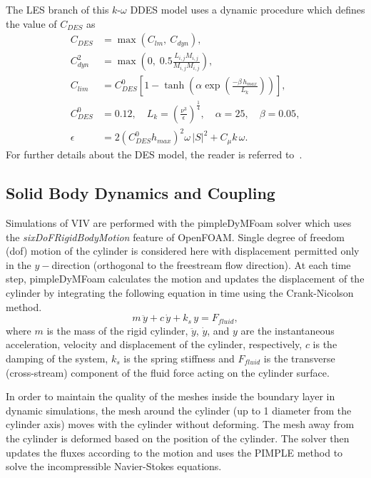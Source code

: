 The LES branch of this $k$-$\omega$ DDES model uses a dynamic procedure which
defines the value of $C_{DES}$ as
%
\begin{align}
  C_{DES}   & =  \max( C_{lm},~C_{dyn} ), \nonumber \\
  C_{dyn}^2 & = \max \left( 0,\; 0.5 \frac{L_{i,j} M_{i,j}}{M_{i,j} M_{i,j}}\right), \nonumber \\
  C_{lim}   &=C_{DES}^0 \left[1-\tanh \left(\alpha \exp \left(\frac{-\beta \, h_{max}}{L_k}\right)\right)\right],\\
  C_{DES}^0 &=0.12, \quad   L_k=\left(\frac{\nu^3}{\epsilon}\right)^{\frac{1}{4}},  \quad  \alpha=25,  \quad  \beta=0.05, \nonumber \\
  \epsilon  &= 2 \left(C_{DES}^0 h_{max} \right)^2 \omega\,|S|^2+C_\mu k\,\omega. \nonumber
\end{align}  
%
For further details about the DES model, the reader is referred
to~\cite{yin2015dynamic}.

\subsection{Solid Body Dynamics and Coupling}
\label{sec:coupling}
%
Simulations of VIV are performed with the pimpleDyMFoam solver which uses the
{\em sixDoFRigidBodyMotion} feature of OpenFOAM. Single degree of freedom (dof)
motion of the cylinder is considered here with displacement permitted only in
the $y-$direction (orthogonal to the freestream flow direction). At each time
step, pimpleDyMFoam calculates the motion and updates the displacement of the
cylinder by integrating the following equation in time using the Crank-Nicolson
method.
%
\begin{equation}
  m\,\ddot{y} + c\,\dot{y} + k_s \,y = F_{fluid},
  \label{eq:solidBodyDynamics}
\end{equation}
%
where $m$ is the mass of the rigid cylinder, $\ddot{y}$, $\dot{y}$, and $y$ are the
instantaneous acceleration, velocity and displacement of the cylinder,
respectively, $c$ is the damping of the system, $k_s$ is the spring stiffness and
$F_{fluid}$ is the transverse (cross-stream) component of the fluid force
acting on the cylinder surface.

In order to maintain the quality of the meshes inside the boundary layer in
dynamic simulations, the mesh around the cylinder (up to 1 diameter from the
cylinder axis) moves with the cylinder without deforming. The mesh away from
the cylinder is deformed based on the position of the cylinder. The solver then
updates the fluxes according to the motion and uses the PIMPLE method to solve
the incompressible Navier-Stokes equations.

